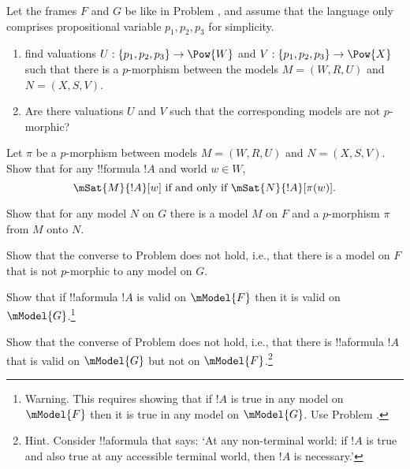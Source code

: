 \documentclass[../../../include/open-logic-section]{subfiles}
\begin{document}
\begin{problem}  [15 points]
  Let the frames ${F}$ and ${G}$ be like in Problem
, and assume that the language only comprises
propositional variable $p_1, p_2, p_3$ for simplicity.
\begin{enumerate}
\item find valuations $U : \{p_1,p_2,p_3\} \to \Pow{W}$ and $V :
\{p_1,p_2,p_3\} \to \Pow{X}$ such that there is a $p$-morphism
between the models ${M} = ({W}, R, U)$ and ${N} = ({X}, S, V)$.
\item Are there valuations $U$ and $V$ such that the corresponding
  models are not $p$-morphic?
\end{enumerate}
\end{problem}


\begin{problem}  [15 points]
  Let $\pi$ be a $p$-morphism between models ${M} =
  ({W}, R, U)$ and ${N} = ({X}, S, V)$. Show that
  for any !!{formula} $!A$ and world $w \in {W}$, 
  \[
  \mSat{M}{!A}[w] \text{ if and only if }
  \mSat{N}{!A}[\pi(w)].
  \]
\end{problem}

\begin{problem}  [15 points]
  Show that for any model ${N}$ on ${G}$ there is a model ${M}$ on
  ${F}$ and a $p$-morphism $\pi$ from ${M}$ onto ${N}$.
\end{problem}

\begin{problem} [10 points]
  Show that the converse to Problem  does not hold,
    i.e., that there is a model on ${F}$ that is not
    $p$-morphic to any model on ${G}$.
\end{problem}

\begin{problem} [10 points]
  Show that if !!a{formula} $!A$ is valid on $\mModel{F}$ then it is
  valid on $\mModel{G}$.\footnote{Warning. This requires showing that
    if $!A$ is true in any model on $\mModel{F}$ then it is true
    in any model on $\mModel{G}$. Use Problem .}
\end{problem}

\begin{problem} [10 points]
  Show that the converse of Problem  does not hold,
  i.e., that there is !!a{formula} $!A$ that is valid on $\mModel{G}$ but
  not on $\mModel{F}$.\footnote{Hint. Consider !!a{formula} that says: `At any
    non-terminal world: if $!A$ is true and also true at any
    accessible terminal world, then $!A$ is necessary.'
}
\end{problem}
\end{document}
